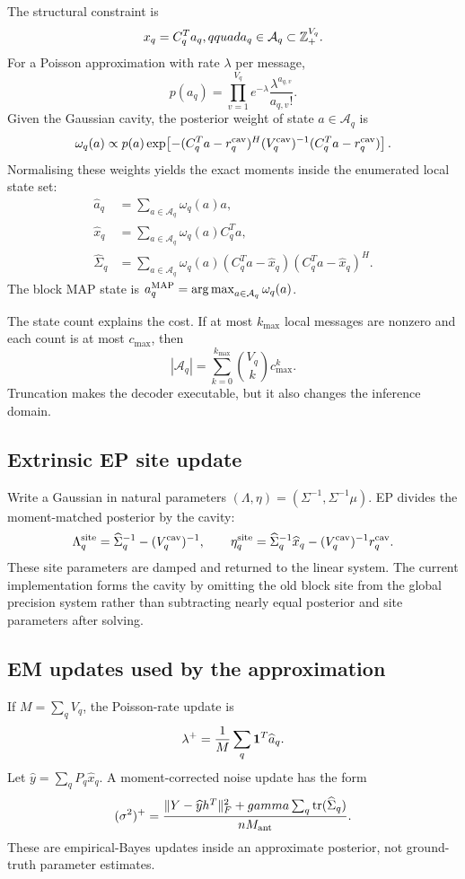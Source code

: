 \documentclass[11pt]{article}
\begin{document}
The structural constraint is
\[
 x_q=C_q^Ta_q,qquad a_q\in\mathcal A_q\subset\mathbb{Z}_+^{V_q}.
\]
For a Poisson approximation with rate $\lambda$ per message,
\[
 p(a_q)=\prod_{v=1}^{V_q}e^{-\lambda}\frac{\lambda^{a_{q,v}}}{a_{q,v}!}.
\]
Given the Gaussian cavity, the posterior weight of state $a\in\mathcal A_q$ is
\[
 \omega_q(a)\propto p(a)
 \exp\!\left[-(C_q^Ta-r_q^{\rm cav})^H(V_q^{\rm cav})^{-1}
 (C_q^Ta-r_q^{\rm cav})\right].
\]
Normalising these weights yields the exact moments inside the enumerated local state set:
\begin{align*}
 \widehat a_q&=\sum_{a\in\mathcal A_q}\omega_q(a)a,\\
 \widehat x_q&=\sum_{a\in\mathcal A_q}\omega_q(a)C_q^Ta,\\
 \widehat\Sigma_q&=\sum_{a\in\mathcal A_q}\omega_q(a)
 (C_q^Ta-\widehat x_q)(C_q^Ta-\widehat x_q)^H.
\end{align*}
The block MAP state is $a_q^{\rm MAP}=\operatorname*{arg\,max}_{a\in\mathcal A_q}\omega_q(a)$.

The state count explains the cost. If at most $k_{\max}$ local messages are nonzero and each count is at most
$c_{\max}$, then
\[
 |\mathcal A_q|=\sum_{k=0}^{k_{\max}}\binom{V_q}{k}c_{\max}^{k}.
\]
Truncation makes the decoder executable, but it also changes the inference domain.

\subsection{Extrinsic EP site update}

Write a Gaussian in natural parameters $(\Lambda,\eta)=(\Sigma^{-1},\Sigma^{-1}\mu)$. EP divides the moment-matched
posterior by the cavity:
\[
 \Lambda_q^{\rm site}=\widehat\Sigma_q^{-1}-(V_q^{\rm cav})^{-1},
 \qquad
 \eta_q^{\rm site}=\widehat\Sigma_q^{-1}\widehat x_q-(V_q^{\rm cav})^{-1}r_q^{\rm cav}.
\]
These site parameters are damped and returned to the linear system. The current implementation forms the cavity by
omitting the old block site from the global precision system rather than subtracting nearly equal posterior and site
parameters after solving.

\subsection{EM updates used by the approximation}

If $M=\sum_qV_q$, the Poisson-rate update is
\[
 \lambda^{+}=\frac{1}{M}\sum_q\mathbf{1}^T\widehat a_q.
\]
Let $\widehat y=\sum_qP_q\widehat x_q$. A moment-corrected noise update has the form
\[
 (\sigma^2)^{+}=\frac{\|Y-\widehat yh^T\|_F^2+gamma\sum_q\operatorname{tr}(\widehat\Sigma_q)}
 {nM_{\rm ant}}.
\]
These are empirical-Bayes updates inside an approximate posterior, not ground-truth parameter estimates.
\end{document}
